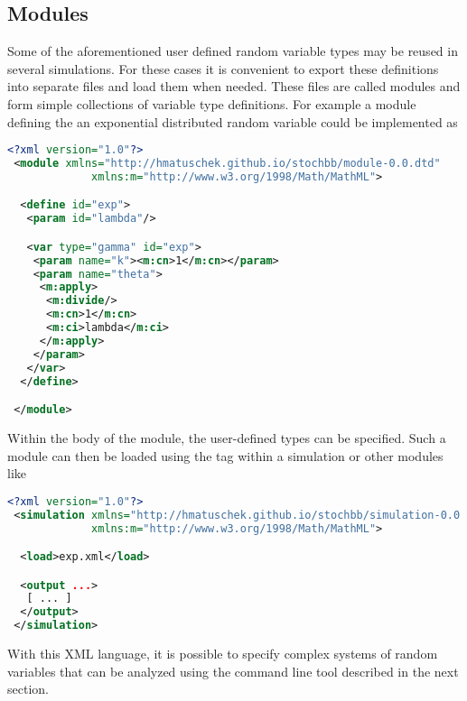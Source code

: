 \subsection{Modules}
Some of the aforementioned user defined random variable types may be reused in several
simulations. For these cases it is convenient to export these definitions into separate files
and load them when needed. These files are called modules and form simple collections of
variable type definitions. For example a module defining the an exponential distributed 
random variable could be implemented as
\begin{lstlisting}[language=XML]
 <?xml version="1.0"?>
 <module xmlns="http://hmatuschek.github.io/stochbb/module-0.0.dtd"
             xmlns:m="http://www.w3.org/1998/Math/MathML">

  <define id="exp">
   <param id="lambda"/>

   <var type="gamma" id="exp">
    <param name="k"><m:cn>1</m:cn></param>
    <param name="theta">
     <m:apply>
      <m:divide/>
      <m:cn>1</m:cn>
      <m:ci>lambda</m:ci>
     </m:apply>
    </param>
   </var>
  </define>

 </module>
\end{lstlisting}

Within the body of the module, the user-defined types can be specified. Such a module can then
be loaded using the  tag within a simulation or other modules like
\begin{lstlisting}[language=XML]
 <?xml version="1.0"?>
 <simulation xmlns="http://hmatuschek.github.io/stochbb/simulation-0.0.dtd"
             xmlns:m="http://www.w3.org/1998/Math/MathML">

  <load>exp.xml</load>

  <output ...>
   [ ... ]
  </output>
 </simulation>
\end{lstlisting}

With this XML language, it is possible to specify complex systems of random variables that can be analyzed 
using the  command line tool described in the next section.
